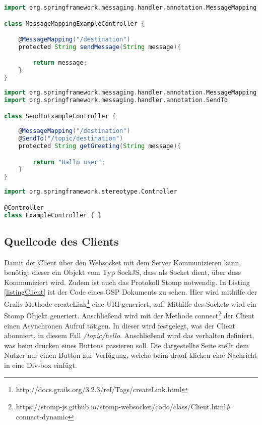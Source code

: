 \begin{lstlisting}[language=Groovy,caption={Beispiel von @MessageMapping}, label=messagmap]
import org.springframework.messaging.handler.annotation.MessageMapping

class MessageMappingExampleController {

    @MessageMapping("/destination")
    protected String sendMessage(String message){

    	return message;
    }
}
\end{lstlisting}

\begin{lstlisting}[language=Groovy,caption={Beispiel von @SendTo}, label=sendto]
import org.springframework.messaging.handler.annotation.MessageMapping
import org.springframework.messaging.handler.annotation.SendTo

class SendToExampleController {
  
	@MessageMapping("/destination")
	@SendTo("/topic/destination")
    protected String getGreeting(String message){

    	return "Hallo user";
    }
}
\end{lstlisting}

\begin{lstlisting}[language=Groovy,caption={Beispiel von @Controller}, label=controller]
import org.springframework.stereotype.Controller

@Controller
class ExampleController { }
\end{lstlisting}

\subsection{Quellcode des Clients}\label{clientKapitel}

Damit der Client über den Websocket mit dem Server Kommunizieren kann, benötigt dieser ein Objekt vom Typ SockJS, dass als Socket dient, über dass Kommuniziert wird. Zudem ist auch das Protokoll Stomp notwendig. In Listing \ref{listingClient} ist der Code eines \ac{GSP} Dokuments zu sehen. Hier wird mithilfe der Grails Methode createLink\footnote{http://docs.grails.org/3.2.3/ref/Tags/createLink.html} eine \ac{URI} generiert, auf.
Mithilfe des Sockets wird ein Stomp Objekt generiert. Anschließend wird mit der Methode connect\footnote{https://stomp-js.github.io/stomp-websocket/codo/class/Client.html\# connect-dynamic} der Client einen Asynchronen Aufruf tätigen. In dieser wird festgelegt, was der Client abonniert, in diesem Fall \textit{/topic/hello}. 
Anschließend wird das verhalten definiert, was beim drücken eines Buttons passieren soll.
Die dargestellte Seite stellt dem Nutzer nur einen Button zur Verfügung, welche beim drauf klicken eine Nachricht in eine Div-box einfügt. 

